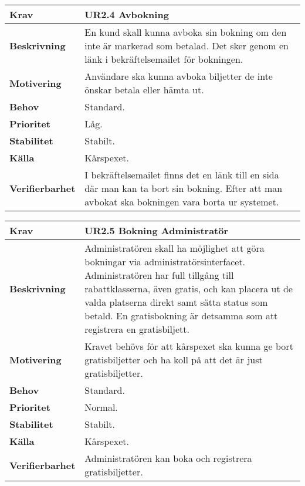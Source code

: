 \documentclass[a4paper, twoside, 11pt, titlepage]{article}
\begin{document}
		\begin{tabular} { p{2.6cm} p{12.5cm} }
			\hline
			\sffamily\textbf{Krav} & \sffamily\textbf{UR2.4 Avbokning  } \\
			\hline
			\sffamily\textbf{Beskrivning} & En kund skall kunna avboka sin bokning om den inte är markerad som betalad. Det sker genom en länk i bekräftelsemailet för bokningen.  \\
			\hline
			\sffamily\textbf{Motivering} & Användare ska kunna avboka biljetter de inte önskar betala eller hämta ut.  \\
			\hline
			\sffamily\textbf{Behov} & Standard.  \\
			\hline
			\sffamily\textbf{Prioritet} & Låg.  \\
			\hline
			\sffamily\textbf{Stabilitet} & Stabilt.  \\
			\hline
			\sffamily\textbf{Källa} & Kårspexet.  \\
			\hline
			\sffamily\textbf{Verifierbarhet} & I bekräftelsemailet finns det en länk till en sida där man kan ta bort sin bokning. Efter att man avbokat ska bokningen vara borta ur systemet.  \\
			\hline
		\end{tabular}
		\vspace{6mm}

		\begin{tabular} { p{2.6cm} p{12.5cm} }
			\hline
			\sffamily\textbf{Krav} & \sffamily\textbf{UR2.5 Bokning Administratör  } \\
			\hline
			\sffamily\textbf{Beskrivning} & Administratören skall ha möjlighet att göra bokningar via administratörsinterfacet. Administratören har full tillgång till rabattklasserna, även gratis, och kan placera ut de valda platserna direkt samt sätta status som betald. En gratisbokning är detsamma som att registrera en gratisbiljett.  \\
			\hline
			\sffamily\textbf{Motivering} & Kravet behövs för att kårspexet ska kunna ge bort gratisbiljetter och ha koll på att det är just gratisbiljetter.  \\
			\hline
			\sffamily\textbf{Behov} & Standard.  \\
			\hline
			\sffamily\textbf{Prioritet} & Normal.  \\
			\hline
			\sffamily\textbf{Stabilitet} & Stabilt.  \\
			\hline
			\sffamily\textbf{Källa} & Kårspexet.  \\
			\hline
			\sffamily\textbf{Verifierbarhet} & Administratören kan boka och registrera gratisbiljetter.  \\
			\hline
		\end{tabular}
		\vspace{6mm}
\end{document}
